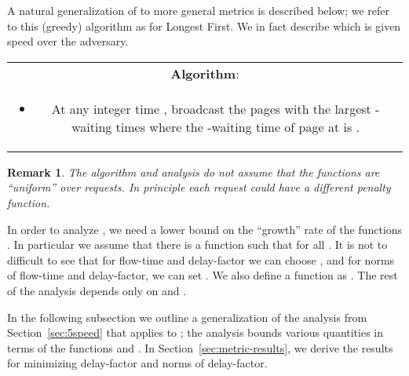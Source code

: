 \documentclass[11pt]{article}
\newtheorem{remark}[lemma]{Remark}
\begin{document}
\begin{titlepage}
A natural generalization of  to more general metrics is described below; we refer to this (greedy) algorithm as
 for Longest First. We in fact describe  which is given  speed over the adversary. \vspace{-2mm}
\begin{center}
\begin{tabular}[r]{|c|}
\hline
\textbf{Algorithm}:  \\
\begin{minipage}{\textwidth}
\begin{itemize}
\item At any integer time , broadcast the  pages with the
largest -waiting times where the -waiting time of page  at 
 is  .
\end{itemize}
\end{minipage}\\
\hline
\end{tabular}
\end{center}

\begin{remark}
  The algorithm and analysis do not assume that the functions 
  are ``uniform'' over requests.  In principle each request 
  could have a different penalty function.
\end{remark}
In order to analyze , we need a lower bound on the ``growth''
rate of the functions . In particular we assume that there
is a function  such that
 for all . It is not to difficult to see that for flow-time and delay-factor
we can choose , and for  norms of
flow-time and delay-factor, we can set .
We also define a function 
as . The rest of the analysis depends
only on  and .

In the following subsection we outline a generalization of the
analysis from Section~\ref{sec:5speed} that applies to ; the
analysis bounds various quantities in terms of the functions  and
.  In Section~\ref{sec:metric-results}, we derive the results for
minimizing delay-factor and  norms of delay-factor.
\vspace{-2.5mm}


\end{titlepage}
\end{document}
